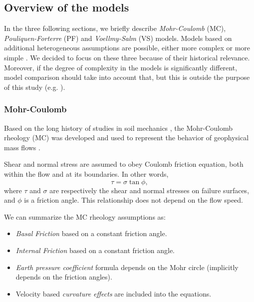 \documentclass{article}
\begin{document}
\subsection{Overview of the models}\label{subsec:Models}
In the three following sections, we briefly describe \emph{Mohr-Coulomb} (MC), \emph{Pouliquen-Forterre} (PF) and \emph{Voellmy-Salm} (VS) models. Models based on additional heterogeneous assumptions are possible, either more complex \citep{PitmanLe2005,Iverson2014} or more simple \citep{DadeHuppert1998}. We decided to focus on these three because of their historical relevance. Moreover, if the degree of complexity in the models is significantly different, model comparison should take into account that, but this is outside the purpose of this study (e.g. \citep{Farrell2015}).

\subsubsection{Mohr-Coulomb}\label{MCM}
Based on the long history of studies in soil mechanics \citep{Rankine1857,DruckerPage52}, the Mohr-Coulomb rheology (MC) was developed and used to represent the behavior of geophysical mass flows \citep{SavageHutter1989}.

Shear and normal stress are assumed to obey Coulomb friction equation, both within the flow and at its boundaries. In other words,
\begin{equation}
\tau = \sigma \tan \phi,
\end{equation}
where $\tau$ and $\sigma$ are respectively the shear and normal stresses on failure surfaces, and $\phi$ is a friction angle. This relationship does not depend on the flow speed.

We can summarize the MC rheology assumptions as:
\begin{itemize}
\item \textit{Basal Friction} based on a constant friction angle.

\item \textit{Internal Friction} based on a constant friction angle.

\item \textit{Earth pressure coefficient} formula depends on the Mohr circle (implicitly depends on the friction angles).

\item Velocity based \textit{curvature effects} are included into the equations.
\end{itemize}
\end{document}
